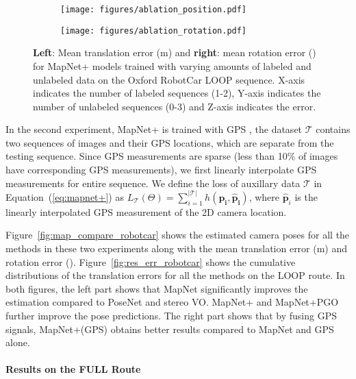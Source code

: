 \begin{figure}
    \centering
    \begin{subfigure}{0.49\linewidth}
        \centering
        \texttt{[image: figures/ablation\_position.pdf]}
    \end{subfigure}
    \hfill
    \begin{subfigure}{0.49\linewidth}
        \centering
        \texttt{[image: figures/ablation\_rotation.pdf]}
    \end{subfigure}
    \vspace{-1em} 
    \caption{\small \textbf{Left}: Mean translation error (m) and \textbf{right}: mean rotation error (\degree) for MapNet+ models trained with 
    varying amounts of labeled and unlabeled data on the Oxford RobotCar LOOP sequence. 
    X-axis indicates the number of labeled sequences (1-2), Y-axis indicates the number of unlabeled sequences (0-3) and Z-axis indicates the error.}
    \label{fig:loop_ablation_robotcar}
\end{figure}


In the second experiment, MapNet+ is trained with GPS \ie, 
the dataset $\mathcal{T}$ contains two sequences of images and their GPS locations, which are separate from the testing sequence.
Since GPS measurements are sparse
(less than 10\% of images have corresponding GPS measurements), we
first linearly interpolate GPS measurements for entire sequence. We
define the loss of auxillary data $\mathcal{T}$ in Equation~(\ref{eq:mapnet+})
as $L_{\mathcal{T}}(\Theta) = \sum_{i=1}^{\vert\mathcal{T}\vert} h(\mathbf{p_i},
\mathbf{\hat{p}_i})$, where $\mathbf{\hat{p}}_i$ is the linearly interpolated GPS measurement of the 2D
camera location. 

Figure~\ref{fig:map_compare_robotcar} shows the estimated camera poses for all
the methods in these two experiments along with the mean translation error (m) and rotation
error (\degree). 
Figure~\ref{fig:res_err_robotcar} shows the cumulative distributions of
the translation errors for all the methods on the LOOP route. In both figures, 
the left part shows that MapNet significantly improves the estimation compared to PoseNet and stereo VO.
MapNet+ and MapNet+PGO further improve the pose predictions. 
The right part shows that by fusing GPS signals,
MapNet+(GPS) obtains better results compared to MapNet and GPS alone.

\vspace{-.5em}
\paragraph{Results on the FULL Route}




